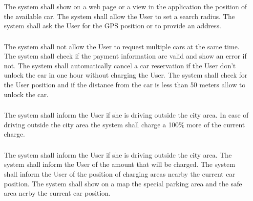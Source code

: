 \subsubsection{}
\begin{itemize}
	\reqcounter The system shall show on a web page or a view in the application the position of the available car.
	\reqcounter The system shall allow the User to set a search radius.
	\reqcounter The system shall ask the User for the GPS position or to provide an address.
\end{itemize}

\subsubsection{}


\subsubsection{}
\begin{itemize}
	\reqcounter The system shall not allow the User to request multiple cars at the same time.
	\reqcounter The system shall check if the payment information are valid and show an error if not.
	\reqcounter The system shall automatically cancel a car reservation if the User don't unlock the car in one hour without charging the User.
	\reqcounter The system shall check for the User position and if the distance from the car is less than 50 meters
	allow to unlock the car.
\end{itemize}

\subsubsection{}
\begin{itemize}
	
	\reqcounter The system shall inform the User if she is driving outside the city area.
	\reqcounter In case of driving outside the city area the system shall charge a 100\%  more of the current charge.
\end{itemize}



\subsubsection{}

\begin{itemize}
	\reqcounter The system shall inform the User if she is driving outside the city area.
	\reqcounter The system shall inform the User of the amount that will be charged.
	\reqcounter The system shall inform the User of the position of charging areas nearby the current car position.
	\reqcounter The system shall show on a map the special parking area and the safe area nerby the current car position.
\end{itemize}


